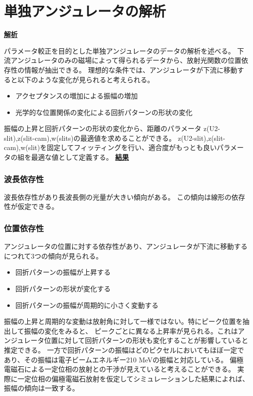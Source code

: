 \documentclass[a4paper,11pt,uplatex]{jsbook}
\begin{document}
\section{単独アンジュレータの解析}
\noindent \textbf{\underline{解析}}\par
パラメータ較正を目的とした単独アンジュレータのデータの解析を述べる。
下流アンジュレータのみの磁場によって得られるデータから、放射光関数の位置依存性の情報が抽出できる。
理想的な条件では、アンジュレータが下流に移動すると以下のような変化が見られると考えられる。
\begin{itemize}
  \item アクセプタンスの増加による振幅の増加
  \item 光学的な位置関係の変化による回折パターンの形状の変化
\end{itemize}

振幅の上昇と回折パターンの形状の変化から、距離のパラメータ z(U2-slit),z(slit-cam),w(slits)の最適値を求めることができる。
z(U2-slit),z(slit-cam),w(slit)を固定してフィッティングを行い、適合度がもっとも良いパラメータの組を最適な値として定義する。
\noindent \textbf{\underline{結果}}\par

\subsubsection{波長依存性}
波長依存性があり長波長側の光量が大きい傾向がある。
この傾向は線形の依存性が仮定できる。\\
\subsubsection{位置依存性}
アンジュレータの位置に対する依存性があり、アンジュレータが下流に移動するにつれて3つの傾向が見られる。
\begin{itemize}
  \item 回折パターンの振幅が上昇する
  \item 回折パターンの形状が変化する
  \item 回折パターンの振幅が周期的に小さく変動する
\end{itemize}
振幅の上昇と周期的な変動は放射角に対して一様ではない。特にピーク位置を抽出して振幅の変化をみると、
ピークごとに異なる上昇率が見られる。これはアンジュレータ位置に対して回折パターンの形状も変化することが影響していると推定できる。
一方で回折パターンの振幅はどのピクセルにおいてもほぼ一定であり、その振幅は電子ビームエネルギー210 MeVの振幅と対応している。
偏極電磁石による一定位相の放射との干渉が見えていると考えることができる。
実際に一定位相の偏極電磁石放射を仮定してシミュレーションした結果によれば、振幅の傾向は一致する。\\
\end{document}
